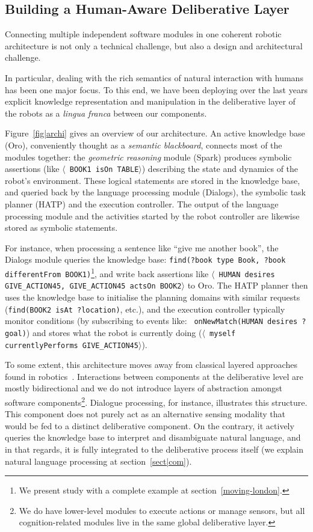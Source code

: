 \documentclass[preprint,3p,times]{elsarticle}
\newcommand{\stmt}[1]{{\footnotesize \tt $\langle$ #1\relax$\rangle$}}
\begin{document}
\subsection{Building a Human-Aware Deliberative Layer}

Connecting multiple independent software modules in one coherent robotic
architecture is not only a technical challenge, but also a design and
architectural challenge.

In particular, dealing with the rich semantics of natural interaction with
humans has been one major focus. To this end, we have been deploying
over the last years explicit knowledge representation and manipulation in the
deliberative layer of the robots as a {\it lingua franca} between our
components.

Figure~\ref{fig|archi} gives an overview of our architecture. An active
knowledge base ({\sc Oro}), conveniently thought as a \emph{semantic
blackboard}, connects most of the modules together: the \emph{geometric
reasoning} module ({\sc Spark}) produces symbolic assertions (like
\stmt{BOOK1 isOn TABLE}) describing the state and dynamics of the robot's
environment. These logical statements are stored in the knowledge base, and
queried back by the language processing module ({\sc Dialogs}), the symbolic task
planner (HATP) and the execution controller. The output of the language
processing module and the activities started by the robot controller are
likewise stored as symbolic statements.

For instance, when processing a sentence like ``give me another book'', the {\sc
Dialogs} module queries the knowledge base: {\tt \footnotesize find(?book type
Book, ?book differentFrom BOOK1)}\footnote{We present study with a complete
example at section~\ref{moving-london}.}, and write back assertions like
\stmt{HUMAN desires GIVE\_ACTION45, GIVE\_ACTION45 actsOn BOOK2} to {\sc
Oro}. The HATP planner then uses the knowledge base to initialise the
planning domains with similar requests ({\tt \footnotesize find(BOOK2 isAt
?location)}, etc.), and the execution controller typically monitor
conditions (by subscribing to events like: {\tt \footnotesize
onNewMatch(HUMAN desires ?goal)}) and stores what the robot is currently
doing (\stmt{myself currentlyPerforms GIVE\_ACTION45}).

To some extent, this architecture moves away from classical layered approaches
found in robotics~\cite{Gat1998three, Volpe2001CLARAty, Goldberg2002}.
Interactions between components at the deliberative level are mostly
bidirectional and we do not introduce layers of abstraction amongst software
components\footnote{We do have lower-level modules to execute actions or manage
sensors, but all cognition-related modules live in the same global deliberative
layer.}. Dialogue processing, for instance, illustrates this structure. This
component does not purely act as an alternative sensing modality that would be
fed to a distinct deliberative component. On the contrary, it actively queries
the knowledge base to interpret and disambiguate natural language, and in that
regards, it is fully integrated to the deliberative process itself (we explain
natural language processing at section~\ref{sect|com}).
\end{document}
